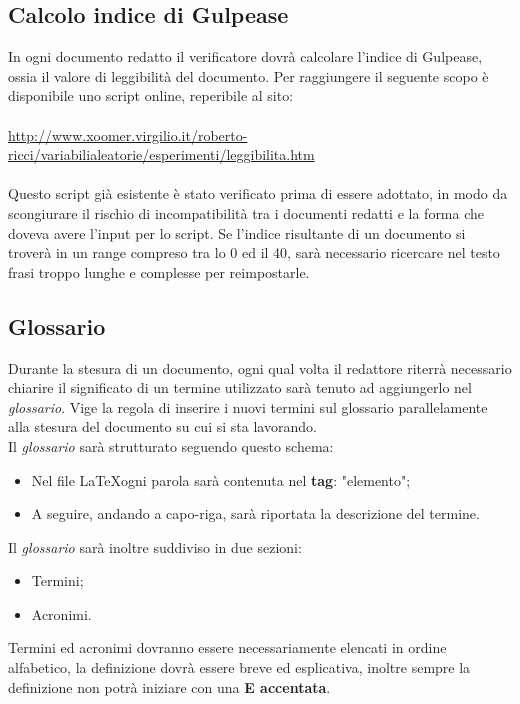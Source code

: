 \subsection{Calcolo indice di Gulpease}
In ogni documento redatto il verificatore dovrà calcolare l'indice di Gulpease, ossia il valore di leggibilità del documento.
Per raggiungere il seguente scopo è disponibile uno script online, reperibile al sito:\\
\\
\href{http://xoomer.virgilio.it/roberto-ricci/variabilialeatorie/esperimenti/leggibilita.htm}{http://www.xoomer.virgilio.it/roberto-ricci/variabilialeatorie/esperimenti/leggibilita.htm}
\\ \\
Questo script già esistente è stato verificato prima di essere adottato, in modo da scongiurare il rischio di incompatibilità tra i documenti redatti e la forma che doveva avere l'input per lo script.
Se l'indice risultante di un documento si troverà in un range compreso tra lo 0 ed il 40, sarà necessario ricercare nel testo frasi troppo lunghe e complesse per reimpostarle.


\subsection{Glossario}
Durante la stesura di un documento, ogni qual volta il redattore riterrà necessario chiarire il significato di un termine utilizzato sarà tenuto ad aggiungerlo nel \textit{glossario}. Vige la regola di inserire i nuovi termini sul glossario parallelamente alla stesura del documento su cui si sta lavorando.\\
Il \textit{glossario} sarà strutturato seguendo questo schema:
\begin{itemize}
\item Nel file \LaTeX ogni parola sarà contenuta nel \textbf{tag}: "elemento";
\item A seguire, andando a capo-riga, sarà riportata la descrizione del termine.
\end{itemize}
Il \textit{glossario} sarà inoltre suddiviso in due sezioni:
\begin{itemize}
\item Termini;
\item Acronimi.
\end{itemize}
Termini ed acronimi dovranno essere necessariamente elencati in ordine alfabetico, la definizione dovrà essere breve ed esplicativa, inoltre sempre la definizione non potrà iniziare con una \textbf{E accentata}.